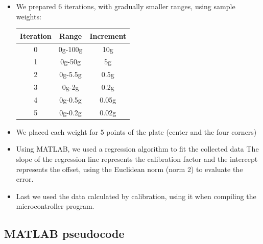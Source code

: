 \begin{itemize}
\item We prepared 6 iterations, with gradually smaller ranges, using sample weights:

\begin{tabular}{|c|c|c|}
\hline
\textbf{Iteration} & \textbf{Range} & \textbf{Increment} \\
\hline
0 & 0g-100g & 10g \\
1 & 0g-50g & 5g \\
2 & 0g-5.5g & 0.5g \\
3 & 0g-2g & 0.2g \\
4 & 0g-0.5g & 0.05g \\
5 & 0g-0.2g & 0.02g \\
\hline
\end{tabular}

\item We placed each weight for 5 points of the plate (center and the four corners)

\item Using MATLAB, we used a regression algorithm to fit the collected data The slope of the regression line represents the calibration factor and the intercept represents the offset, using the Euclidean norm (norm 2) to evaluate the error.

\item Last we used the data calculated by calibration, using it when compiling the microcontroller program.
\end{itemize}

\subsection{MATLAB pseudocode}


